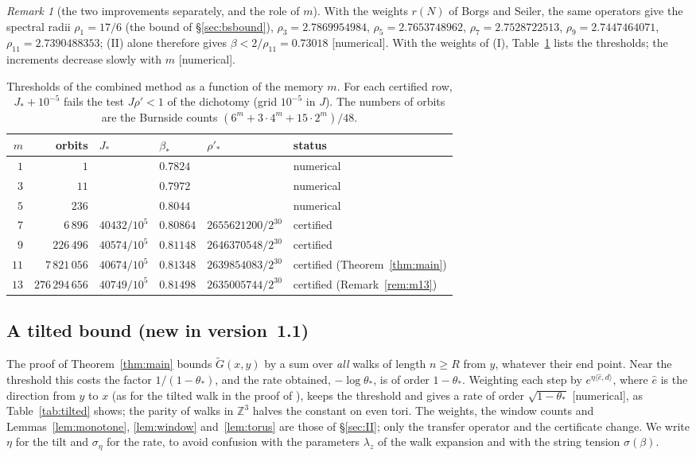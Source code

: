 \documentclass[11pt,a4paper]{article}
\theoremstyle{plain}
\theoremstyle{remark}
\newtheorem{remark}[theorem]{Remark}
\numberwithin{equation}{section}
\newcommand{\Z}{\mathbb{Z}}
\newcommand{\Gt}{\widetilde G}
\newcommand{\st}[1]{\textsf{[#1]}}
\begin{document}
\begin{remark}[the two improvements separately, and the role of $m$]\label{rem:contrib}
With the weights $r(N)$ of Borgs and Seiler, the same operators give the spectral radii $\rho_1=17/6$ (the bound of
\S\ref{sec:bsbound}), $\rho_3=2.7869954984$, $\rho_5=2.7653748962$, $\rho_7=2.7528722513$, $\rho_9=2.7447464071$,
$\rho_{11}=2.7390488353$; (II) alone therefore gives $\beta<2/\rho_{11}=0.73018$ \st{numerical}. With the weights of (I),
Table~\ref{tab:memory} lists the thresholds; the increments decrease slowly with $m$ \st{numerical}.
\end{remark}

\begin{table}[ht]
\centering\small
\begin{tabular}{@{}rrllll@{}}
\toprule
$m$ & orbits & $J_*$ & $\beta_*$ & $\rho'_*$ & status\\
\midrule
$1$ & $1$ & & $0.7824$ & & numerical\\
$3$ & $11$ & & $0.7972$ & & numerical\\
$5$ & $236$ & & $0.8044$ & & numerical\\
$7$ & $6\,896$ & $40432/10^5$ & $0.80864$ & $2655621200/2^{30}$ & certified\\
$9$ & $226\,496$ & $40574/10^5$ & $0.81148$ & $2646370548/2^{30}$ & certified\\
$11$ & $7\,821\,056$ & $40674/10^5$ & $0.81348$ & $2639854083/2^{30}$ & certified (Theorem~\ref{thm:main})\\
$13$ & $276\,294\,656$ & $40749/10^5$ & $0.81498$ & $2635005744/2^{30}$ & certified (Remark~\ref{rem:m13})\\
\bottomrule
\end{tabular}
\caption{Thresholds of the combined method as a function of the memory $m$. For each certified row, $J_*+10^{-5}$ fails the test
$J\rho'<1$ of the dichotomy (grid $10^{-5}$ in $J$). The numbers of orbits are the Burnside counts $(6^m+3\cdot4^m+15\cdot2^m)/48$.}
\label{tab:memory}
\end{table}

\subsection{A tilted bound (new in version~1.1)}\label{sec:tilted}
The proof of Theorem~\ref{thm:main} bounds $\Gt(x,y)$ by a sum over \emph{all} walks of length $n\ge R$ from $y$, whatever their end
point. Near the threshold this costs the factor $1/(1-\theta_*)$, and the rate obtained, $-\log\theta_*$, is of order $1-\theta_*$.
Weighting each step by $e^{\eta\langle\hat e,d\rangle}$, where $\hat e$ is the direction from $y$ to $x$ (as for the tilted walk in the
proof of \cite[Thm.~7.1]{D7}), keeps the threshold and gives a rate of order $\sqrt{1-\theta_*}$ \st{numerical}, as Table~\ref{tab:tilted}
shows; the parity of walks in $\Z^3$ halves the constant on even tori. The weights, the window counts and Lemmas~\ref{lem:monotone},
\ref{lem:window} and~\ref{lem:torus} are those of \S\ref{sec:II}; only the transfer operator and the certificate change. We write $\eta$
for the tilt and $\sigma_\eta$ for the rate, to avoid confusion with the parameters $\lambda_z$ of the walk expansion and with the string
tension $\sigma(\beta)$.
\end{document}

